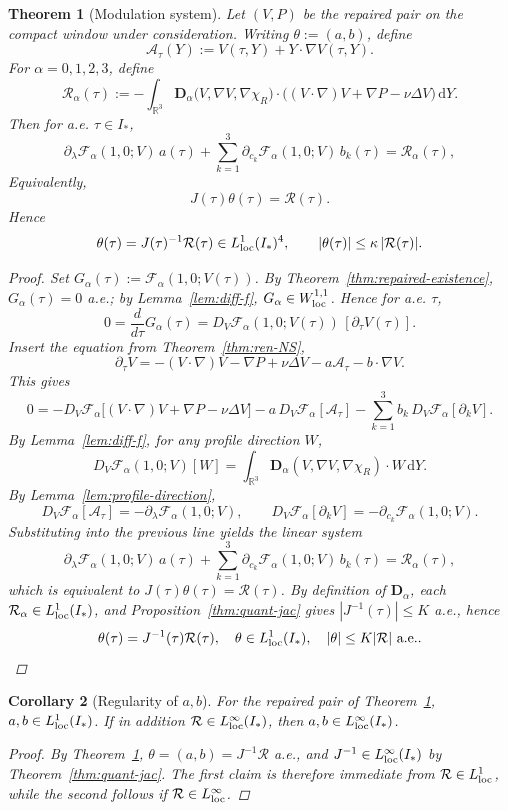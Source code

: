 \documentclass[11pt]{amsart}
\theoremstyle{plain}
\newtheorem{theorem}{Theorem}[section]
\newtheorem{corollary}[theorem]{Corollary}
\theoremstyle{definition}
\theoremstyle{remark}
\newcommand{\dd}{\mathrm d}
\newcommand{\RR}{\mathbb R}
\newcommand{\nn}{\nabla}
\begin{document}
\begin{theorem}[Modulation system]\label{thm:mod-sys}
Let \((V,P)\) be the repaired pair on the compact window under consideration.
Writing \(\theta:=(a,b)\), define
\[
\mathcal A_\tau(Y):=V(\tau,Y)+Y\cdot\nn V(\tau,Y).
\]
For \(\alpha=0,1,2,3\), define
\[
\mathcal R_\alpha(\tau):=
-\int_{\RR^3}\mathbf D_\alpha\bigl(V,\nn V,\nabla\chi_R\bigr)
\cdot\bigl((V\cdot\nn)V+\nabla P-\nu\Delta V\bigr)\,\dd Y.
\]
Then for a.e. \(\tau\in I_*\),
\[
\partial_\lambda\mathcal F_\alpha(1,0;V)\,a(\tau)
+\sum_{k=1}^3\partial_{c_k}\mathcal F_\alpha(1,0;V)\,b_k(\tau)
=\mathcal R_\alpha(\tau),
\]
Equivalently,
\[
J(\tau)\theta(\tau)=\mathcal R(\tau).
\]
Hence
\[
\theta(\tau)=J(\tau)^{-1}\mathcal R(\tau)\in L^1_{\rm loc}(I_*)^4,
\qquad |\theta(\tau)|\le \kappa\,|\mathcal R(\tau)|.
\]
\begin{proof}
Set \(G_\alpha(\tau):=\mathcal F_\alpha(1,0;V(\tau))\). By Theorem~\ref{thm:repaired-existence},
\(G_\alpha(\tau)=0\) a.e.; by Lemma~\ref{lem:diff-f}, \(G_\alpha\in W^{1,1}_{\rm loc}\).
Hence for a.e. \(\tau\),
\[
0=\frac{d}{d\tau}G_\alpha(\tau)
=D_V\mathcal F_\alpha(1,0;V(\tau))\,[\partial_\tau V(\tau)].
\]
Insert the equation from Theorem~\ref{thm:ren-NS},
\[
\partial_\tau V=-(V\cdot\nn)V-\nabla P+\nu\Delta V-a\mathcal A_\tau-b\cdot\nn V.
\]
This gives
\[
0=-D_V\mathcal F_\alpha\bigl[(V\cdot\nn)V+\nabla P-\nu\Delta V\bigr]
-a\,D_V\mathcal F_\alpha[\mathcal A_\tau]
-\sum_{k=1}^3b_k\,D_V\mathcal F_\alpha[\partial_kV].
\]
By Lemma~\ref{lem:diff-f}, for any profile direction \(W\),
\[
D_V\mathcal F_\alpha(1,0;V)[W]=\int_{\RR^3}\mathbf D_\alpha(V,\nn V,\nabla\chi_R)\cdot W\,\dd Y.
\]
By Lemma~\ref{lem:profile-direction},
\[
D_V\mathcal F_\alpha[\mathcal A_\tau]=-\partial_\lambda\mathcal F_\alpha(1,0;V),\qquad
D_V\mathcal F_\alpha[\partial_kV]=-\partial_{c_k}\mathcal F_\alpha(1,0;V).
\]
Substituting into the previous line yields the linear system
\[
\partial_\lambda\mathcal F_\alpha(1,0;V)\,a(\tau)
+\sum_{k=1}^3\partial_{c_k}\mathcal F_\alpha(1,0;V)\,b_k(\tau)
=\mathcal R_\alpha(\tau),
\]
which is equivalent to \(J(\tau)\theta(\tau)=\mathcal R(\tau)\).
By definition of \(\mathbf D_\alpha\), each \(\mathcal R_\alpha\in L^1_{\rm loc}(I_*)\), and
Proposition~\ref{thm:quant-jac} gives \(|J^{-1}(\tau)|\le K\) a.e., hence
\[\theta(\tau)=J^{-1}(\tau)\mathcal R(\tau),\quad 
\theta\in L^1_{\rm loc}(I_*),\quad |\theta|\le K|\mathcal R|\text{ a.e.}.\]
\end{proof}
\end{theorem}

\begin{corollary}[Regularity of \(a,b\)]
For the repaired pair of Theorem~\ref{thm:mod-sys}, \(a,b\in L^1_{\rm loc}(I_*)\).  
If in addition \(\mathcal R\in L^\infty_{\rm loc}(I_*)\), then \(a,b\in
L^\infty_{\rm loc}(I_*)\).
\begin{proof}
By Theorem~\ref{thm:mod-sys}, \(\theta=(a,b)=J^{-1}\mathcal R\) a.e., and
\(J^{-1}\in L^\infty_{\rm loc}(I_*)\) by Theorem~\ref{thm:quant-jac}. The first claim is therefore
immediate from \(\mathcal R\in L^1_{\rm loc}\), while the second follows if \(\mathcal R\in L^\infty_{\rm loc}\).
\end{proof}
\end{corollary}
\end{document}
